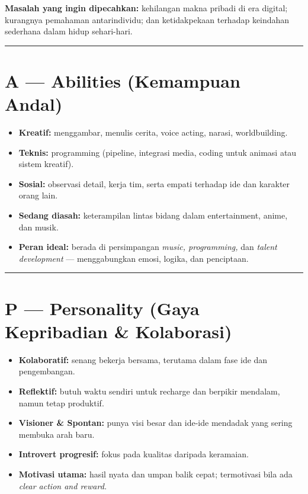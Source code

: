 \documentclass[
  letterpaper,
  DIV=11,
  numbers=noendperiod]{scrreprt}
\providecommand{\tightlist}{%
  \setlength{\itemsep}{0pt}\setlength{\parskip}{0pt}}
\begin{document}
\textbf{Masalah yang ingin dipecahkan:} kehilangan makna pribadi di era
digital; kurangnya pemahaman antarindividu; dan ketidakpekaan terhadap
keindahan sederhana dalam hidup sehari-hari.

\begin{center}\rule{0.5\linewidth}{0.5pt}\end{center}

\section{A --- Abilities (Kemampuan
Andal)}\label{a-abilities-kemampuan-andal}

\begin{itemize}
\tightlist
\item
  \textbf{Kreatif:} menggambar, menulis cerita, voice acting, narasi,
  worldbuilding.\\
\item
  \textbf{Teknis:} programming (pipeline, integrasi media, coding untuk
  animasi atau sistem kreatif).\\
\item
  \textbf{Sosial:} observasi detail, kerja tim, serta empati terhadap
  ide dan karakter orang lain.\\
\item
  \textbf{Sedang diasah:} keterampilan lintas bidang dalam
  entertainment, anime, dan musik.\\
\item
  \textbf{Peran ideal:} berada di persimpangan \emph{music,
  programming,} dan \emph{talent development} --- menggabungkan emosi,
  logika, dan penciptaan.
\end{itemize}

\begin{center}\rule{0.5\linewidth}{0.5pt}\end{center}

\section{P --- Personality (Gaya Kepribadian \&
Kolaborasi)}\label{p-personality-gaya-kepribadian-kolaborasi}

\begin{itemize}
\tightlist
\item
  \textbf{Kolaboratif:} senang bekerja bersama, terutama dalam fase ide
  dan pengembangan.\\
\item
  \textbf{Reflektif:} butuh waktu sendiri untuk recharge dan berpikir
  mendalam, namun tetap produktif.\\
\item
  \textbf{Visioner \& Spontan:} punya visi besar dan ide-ide mendadak
  yang sering membuka arah baru.\\
\item
  \textbf{Introvert progresif:} fokus pada kualitas daripada
  keramaian.\\
\item
  \textbf{Motivasi utama:} hasil nyata dan umpan balik cepat;
  termotivasi bila ada \emph{clear action and reward.}
\end{itemize}
\end{document}
